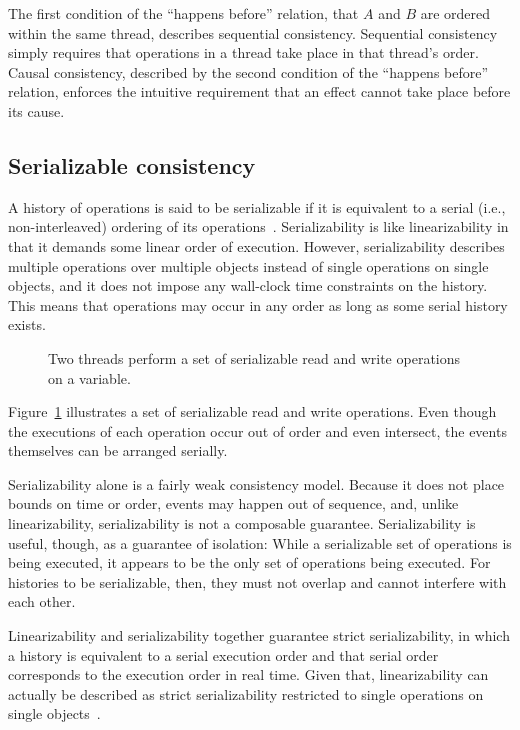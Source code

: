 \documentclass{sig-alternate}
\begin{document}
The first condition of the ``happens before'' relation, that $A$ and $B$ are ordered within the same thread, describes sequential consistency. Sequential consistency simply requires that operations in a thread take place in that thread's order. Causal consistency, described by the second condition of the ``happens before'' relation, enforces the intuitive requirement that an effect cannot take place before its cause.

\subsection{Serializable consistency}

A history of operations is said to be serializable if it is equivalent to a serial (i.e., non-interleaved) ordering of its operations~\cite{Herlihy1990}. Serializability is like linearizability in that it demands some linear order of execution. However, serializability describes multiple operations over multiple objects instead of single operations on single objects, and it does not impose any wall-clock time constraints on the history. This means that operations may occur in any order as long as some serial history exists.

\begin{figure}[ht]
  \centering
  \resizebox{0.63\linewidth}{!}{}
  \caption{Two threads perform a set of serializable read and write operations on a variable.}
\label{figure:serializability}
\end{figure}

Figure~\ref{figure:serializability} illustrates a set of serializable read and write operations. Even though the executions of each operation occur out of order and even intersect, the events themselves can be arranged serially.

Serializability alone is a fairly weak consistency model. Because it does not place bounds on time or order, events may happen out of sequence, and, unlike linearizability, serializability is not a composable guarantee. Serializability is useful, though, as a guarantee of isolation: While a serializable set of operations is being executed, it appears to be the only set of operations being executed. For histories to be serializable, then, they must not overlap and cannot interfere with each other.

Linearizability and serializability together guarantee strict serializability, in which a history is equivalent to a serial execution order and that serial order corresponds to the execution order in real time. Given that, linearizability can actually be described as strict serializability restricted to single operations on single objects~\cite{Herlihy1990}.
\end{document}

